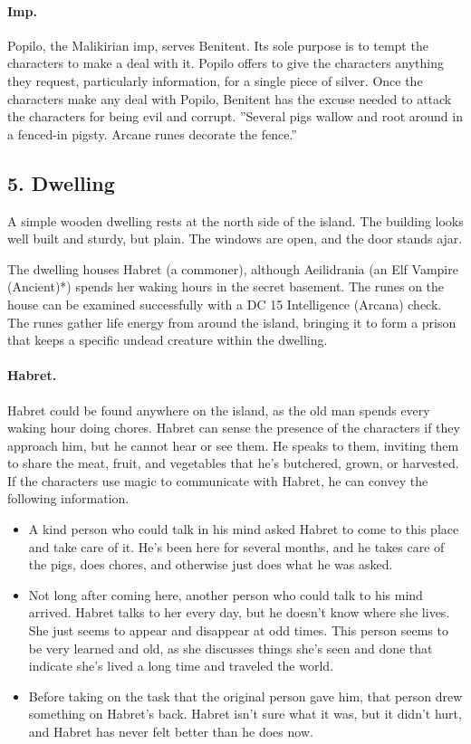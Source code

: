 \documentclass[10pt,a4paper,twoside,twocolumn,openany,bg=print,nodeprecatedcode]{dndbook}
\begin{document}
\paragraph{Imp.}
Popilo, the Malikirian imp, serves Benitent. Its sole purpose is to tempt the characters to make a deal with it. Popilo offers to give the characters anything they request, particularly information, for a single piece of silver. Once the characters make any deal with Popilo, Benitent has the excuse needed to attack the characters for being evil and corrupt.
\DndQuote%
{}
{''Several pigs wallow and root around in a fenced-in pigsty. Arcane runes decorate the fence.''}
{}
\subsection{5. Dwelling}
\begin{DndReadAloud}{}
A simple wooden dwelling rests at the north side of the island. The building looks well built and sturdy, but plain. The windows are open, and the door stands ajar.
\end{DndReadAloud}

The dwelling houses Habret (a commoner), although Aeilidrania (an Elf Vampire (Ancient)*) spends her waking hours in the secret basement. The runes on the house can be examined successfully with a DC 15 Intelligence (Arcana) check. The runes gather life energy from around the island, bringing it to form a prison that keeps a specific undead creature within the dwelling.
\paragraph{Habret.}
Habret could be found anywhere on the island, as the old man spends every waking hour doing chores. Habret can sense the presence of the characters if they approach him, but he cannot hear or see them. He speaks to them, inviting them to share the meat, fruit, and vegetables that he's butchered, grown, or harvested.
If the characters use magic to communicate with Habret, he can convey the following information.

\begin{itemize}
\item A kind person who could talk in his mind asked Habret to come to this place and take care of it. He's been here for several months, and he takes care of the pigs, does chores, and otherwise just does what he was asked.
\item Not long after coming here, another person who could talk to his mind arrived. Habret talks to her every day, but he doesn't know where she lives. She just seems to appear and disappear at odd times. This person seems to be very learned and old, as she discusses things she's seen and done that indicate she's lived a long time and traveled the world.
\item Before taking on the task that the original person gave him, that person drew something on Habret's back. Habret isn't sure what it was, but it didn't hurt, and Habret has never felt better than he does now.
\end{itemize}
\end{document}
